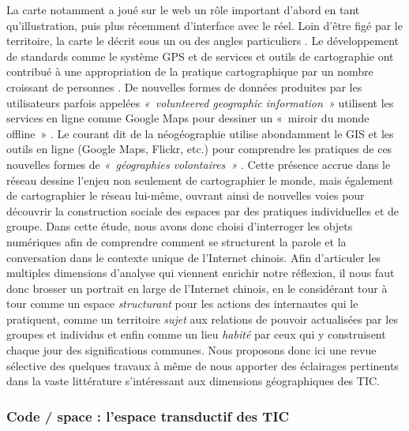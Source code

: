 La carte notamment a joué sur le web un rôle important d’abord en tant qu’illustration, puis plus récemment d’interface avec le réel. Loin d’être figé par le territoire, la carte le décrit sous un ou des angles particuliers \citep{Brunet1987, Jacob1992}. Le développement de standards comme le système GPS \citep{Haklay2008} et de services et outils de cartographie ont contribué à une appropriation de la pratique cartographique par un nombre croissant de personnes \citep{Crampton2009}. De nouvelles formes de données produites par les utilisateurs parfois appelées \textit{« volunteered geographic information »} \citep{Elwood2008} utilisent les services en ligne comme Google Maps pour dessiner un « miroir du monde offline » \citep{Graham2011}. Le courant dit de la néogéographie utilise abondamment le GIS et les outils en ligne (Google Maps, Flickr, etc.) pour comprendre les pratiques de ces nouvelles formes de \textit{« géographies volontaires »} \citep{Turner2006}. Cette présence accrue dans le réseau dessine l’enjeu non seulement de cartographier le monde, mais également de cartographier le réseau lui-même, ouvrant ainsi de nouvelles voies pour découvrir la construction sociale des espaces par des pratiques individuelles et de groupe. Dans cette étude, nous avons donc choisi d’interroger les objets numériques afin de comprendre comment se structurent la parole et la conversation dans le contexte unique de l’Internet chinois. Afin d’articuler les multiples dimensions d’analyse qui viennent enrichir notre réflexion, il nous faut donc brosser un portrait en large de l’Internet chinois, en le considérant tour à tour comme un espace \textit{structurant} pour les actions des internautes qui le pratiquent, comme un territoire \textit{sujet} aux relations de pouvoir actualisées par les groupes et individus et enfin comme un lieu \textit{habité} par ceux qui y construisent chaque jour des significations communes. Nous proposons donc ici une revue sélective des quelques travaux à même de nous apporter des éclairages pertinents dans la vaste littérature s’intéressant aux dimensions géographiques des TIC.

\subsubsection[Code / space : l’espace transductif des TIC]{Code / space : l’espace transductif des TIC}


